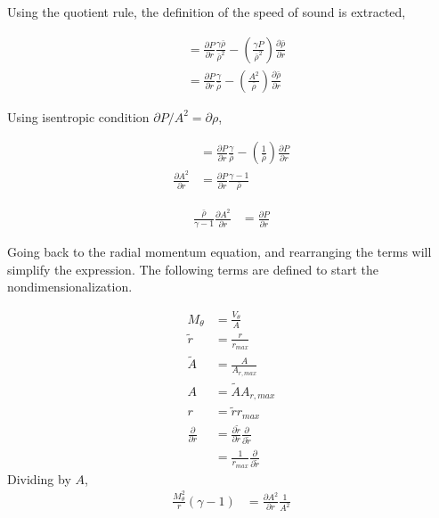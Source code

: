 Using the quotient rule, the definition of the speed of sound is extracted,

\begin{align*}
&= \frac{\partial P}{\partial r} \frac{\gamma \bar{\rho}}{\bar{\rho}^2} -
\left(
    \frac{\gamma P}{\bar{\rho}^2} 
\right) 
\frac{\partial \bar{\rho}}{\partial r}\\
&=  \frac{\partial P}{\partial r} \frac{\gamma }{\bar{\rho}} -
\left( \frac{A^2}{\bar{\rho}} \right) 
\frac{\partial \bar{\rho} }{\partial r}
\end{align*}

Using isentropic condition $ \partial P/A^2 = \partial \rho$, 

\begin{align*}
&= \frac{\partial P}{\partial r} \frac{\gamma }{\bar{\rho}} -
\left( \frac{1}{\bar{\rho}} \right) \frac{\partial  P }{\partial r}\\
\frac{\partial A^2}{\partial r} 
&= \frac{\partial P}{\partial r} \frac{\gamma - 1}{\bar{\rho}}  
\end{align*}

\begin{align*}
    \frac{\bar{\rho}}{\gamma -1}\frac{\partial A^2}{\partial r} &= \frac{\partial P}{\partial r} 
\end{align*}


Going back to the radial momentum equation, and rearranging the terms will simplify 
the expression. The following terms are defined to start the
nondimensionalization.  

\begin{align*}
    M_{\theta} &= \frac{V_{\theta}}{A} \\ 
    \widetilde{r} &= \frac{r}{r_{max}}  \\
    \widetilde{A} &= \frac{A}{A_{r,max}}  \\
    A &= \widetilde{A}{A_{r,max}} \\
    r &= \widetilde{r}{r_{max}}\\
    \frac{\partial}{\partial r} &=
    \frac{\partial \widetilde{r}}{\partial r} \frac{\partial}{\partial \widetilde{r}}\\
                                &= \frac{1}{r_{max}}\frac{\partial}{\partial \widetilde{r}}
\end{align*}
Dividing by $A$,
\begin{align*}
    \frac{M_{\theta}^2}{r}\left(\gamma - 1\right) 
 &= \frac{\partial A^2}{\partial r} \frac{1}{A^2}
\end{align*}

